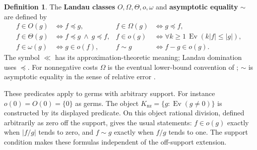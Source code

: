 \documentclass[11pt,a4paper]{article}
\numberwithin{algorithm}{section}
\numberwithin{equation}{section}
\theoremstyle{definition}
\newtheorem{definition}[definition]{Definition}
\theoremstyle{remark}
\theoremstyle{plain}
\newcommand{\way}{\mathrel{\ll}}
\newcommand{\Ev}{{\operatorname{Ev}}}
\newcommand{\abs}[1]{\lvert #1\rvert}
\theoremstyle{definition}
\theoremstyle{plain}
\begin{document}
\begin{definition}\label{def:landau}
The \textbf{Landau classes} $O,\Omega,\Theta,o,\omega$ and
\textbf{asymptotic equality} $\sim$ are defined by
\[
\begin{aligned}
 f\in O(g)&\iff f\preceq g,&
 f\in\Omega(g)&\iff g\preceq f,\\
 f\in\Theta(g)&\iff f\preceq g\ \wedge\ g\preceq f,&
 f\in o(g)&\iff\forall k\ge1\,\Ev(k\abs f\le\abs g),\\
 f\in\omega(g)&\iff g\in o(f),&
 f\sim g&\iff f-g\in o(g).
\end{aligned}
\]
The symbol $\way$ has its approximation-theoretic
meaning; Landau domination uses $\preceq$.
For nonnegative costs $\Omega$ is the eventual lower-bound
convention of \citep{Knuth}; $\sim$ is asymptotic equality in
the sense of relative error \citep{DLMF}.
\end{definition}

These predicates apply to germs with arbitrary support.
For instance $o(0)=O(0)=\{0\}$ as germs. The object
$K_{\mathrm{nz}}=\{g:\Ev(g\ne0)\}$ is constructed by its
displayed predicate. On this object rational division, defined
arbitrarily as zero off the support, gives the usual statements:
$f\in o(g)$ exactly when $\abs{f/g}$ tends to zero, and
$f\sim g$ exactly when $f/g$ tends to one. The support condition
makes these formulas independent of the off-support extension.
\end{document}
